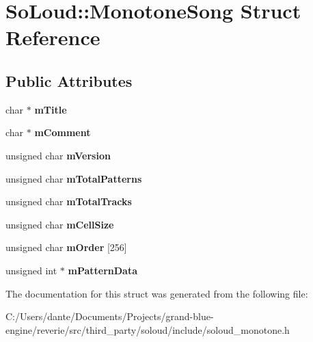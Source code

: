 \hypertarget{struct_so_loud_1_1_monotone_song}{}\section{So\+Loud\+::Monotone\+Song Struct Reference}
\label{struct_so_loud_1_1_monotone_song}
\subsection*{Public Attributes}
\begin{DoxyCompactItemize}
\item 
\mbox{\label{struct_so_loud_1_1_monotone_song_ad4dbcdae4046658e37581cd5fde44686}} 
char $\ast$ {\bfseries m\+Title}
\item 
\mbox{\label{struct_so_loud_1_1_monotone_song_a1938dec3e97a6561e7ece26402db4e7f}} 
char $\ast$ {\bfseries m\+Comment}
\item 
\mbox{\label{struct_so_loud_1_1_monotone_song_a78d84ce7c2f2867d6779ff5a247c7ba1}} 
unsigned char {\bfseries m\+Version}
\item 
\mbox{\label{struct_so_loud_1_1_monotone_song_a4f17e14176d11f02d30b8fc3294bbe59}} 
unsigned char {\bfseries m\+Total\+Patterns}
\item 
\mbox{\label{struct_so_loud_1_1_monotone_song_a9acafb9b59449813cc4b2a5a52cfe077}} 
unsigned char {\bfseries m\+Total\+Tracks}
\item 
\mbox{\label{struct_so_loud_1_1_monotone_song_a6a12624368eab485c8f11f3a1afec9e1}} 
unsigned char {\bfseries m\+Cell\+Size}
\item 
\mbox{\label{struct_so_loud_1_1_monotone_song_a2aee4e18529f975d4643ab1a1e545351}} 
unsigned char {\bfseries m\+Order} \mbox{[}256\mbox{]}
\item 
\mbox{\label{struct_so_loud_1_1_monotone_song_af0268cbc0e458a3b2fae806c65d86649}} 
unsigned int $\ast$ {\bfseries m\+Pattern\+Data}
\end{DoxyCompactItemize}


The documentation for this struct was generated from the following file\+:\begin{DoxyCompactItemize}
\item 
C\+:/\+Users/dante/\+Documents/\+Projects/grand-\/blue-\/engine/reverie/src/third\+\_\+party/soloud/include/soloud\+\_\+monotone.\+h\end{DoxyCompactItemize}
